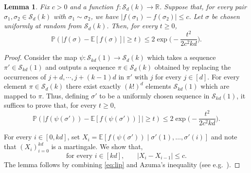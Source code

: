 \documentclass[reqno,final,a4paper]{amsart}
\newtheorem{lemma}[thm]{Lemma}
\theoremstyle{definition}
\newcommand{\cS}{\mathcal{S}}
\newcommand{\1}{\mathbbm{1}}
\begin{document}
\begin{lemma}\label{lem:switchings}
Fix $c>0$ and a function $f:\cS_d(k)\to\mathbb R$. Suppose that, for every pair $\sigma_1,\sigma_2\in \cS_d(k)$ with $\sigma_1\sim \sigma_2$, we have $|f(\sigma_1)-f(\sigma_2)|\le c$. 
Let $\sigma$ be chosen uniformly at random from $\cS_d(k)$. Then, for every $t\ge 0$,
\[\mathbb P(|f(\sigma)-\mathbb E[f(\sigma)]|\ge t)\le 2\exp\bigg(-\frac{t^2}{2c^2kd}\bigg).\]
\end{lemma}
\begin{proof}
Consider the map $\psi:\cS_{kd}(1)\to \cS_{d}(k)$ which takes a sequence $\pi'\in \cS_{kd}(1)$ and outputs a sequence $\pi \in \cS_{d}(k)$ obtained by replacing the occurrences of $j+d,\cdots,j+(k-1)d$ in $\pi'$ with $j$ for every $j\in [d]$. 
For every element $\pi\in \cS_{d}(k)$ there exist exactly $(k!)^d$ elements $\cS_{kd}(1)$ which are mapped to $\pi$. 
Thus, defining $\sigma'$ to be a uniformly chosen sequence in $\cS_{kd}(1)$, it suffices to prove that, for every $t\geq 0$, 
\[\mathbb P(|f(\psi(\sigma'))-\mathbb E[f(\psi(\sigma'))]|\ge t)\le 2\exp\bigg(-\frac{t^2}{2c^2kd}\bigg).\]

For every $i\in [0,kd]$, set $X_i=\mathbb E[f(\psi(\sigma'))\mid \sigma'(1),\ldots,\sigma'(i)]$ and note that $(X_i)_{i=0}^{kd}$ is a martingale. We show that, 
\begin{equation}\label{eq:lip}
\text{for every $i\in [kd]$,}\qquad |X_i-X_{i-1}|\le c.
\end{equation}
The lemma follows by combining \eqref{eq:lip} and Azuma's inequality (see e.g.\ \cite[Theorem~2.25]{JLR00}).


\end{proof}
\end{document}
